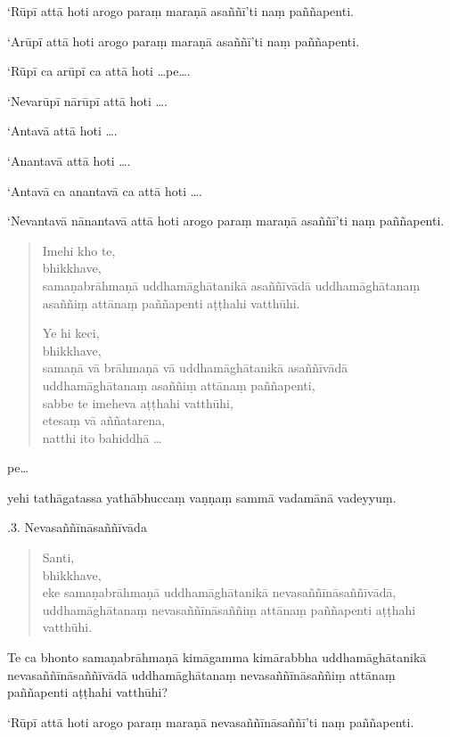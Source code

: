 \documentclass[11pt,twoside,openright]{book}
\begin{document}
\pstart
‘Rūpī attā hoti arogo paraṃ maraṇā asaññī’ti naṃ paññapenti.
\pend

\pstart
‘Arūpī attā hoti arogo paraṃ maraṇā asaññī’ti naṃ paññapenti.
\pend

\pstart
‘Rūpī ca arūpī ca attā hoti …pe….
\pend

\pstart
‘Nevarūpī nārūpī attā hoti ….
\pend

\pstart
‘Antavā attā hoti ….
\pend

\pstart
‘Anantavā attā hoti ….
\pend

\pstart
‘Antavā ca anantavā ca attā hoti ….
\pend

\pstart
‘Nevantavā nānantavā attā hoti arogo paraṃ maraṇā asaññī’ti naṃ paññapenti.
\pend

\begin{verse}
Imehi kho te,\\
\vin  bhikkhave,\\
\vin  samaṇabrāhmaṇā uddhamāghātanikā asaññīvādā uddhamāghātanaṃ asaññiṃ attānaṃ paññapenti aṭṭhahi vatthūhi.

Ye hi keci,\\
\vin  bhikkhave,\\
\vin  samaṇā vā brāhmaṇā vā uddhamāghātanikā asaññīvādā uddhamāghātanaṃ asaññiṃ attānaṃ paññapenti,\\
\vin  sabbe te imeheva aṭṭhahi vatthūhi,\\
\vin  etesaṃ vā aññatarena,\\
\vin  natthi ito bahiddhā …

\end{verse}
\pstart
pe…
\pend

\pstart
yehi tathāgatassa yathābhuccaṃ vaṇṇaṃ sammā vadamānā vadeyyuṃ.
\pend

.3. Nevasaññīnāsaññīvāda
\pend

\begin{verse}
Santi,\\
\vin  bhikkhave,\\
\vin  eke samaṇabrāhmaṇā uddhamāghātanikā nevasaññīnāsaññīvādā,\\
\vin  uddhamāghātanaṃ nevasaññīnāsaññiṃ attānaṃ paññapenti aṭṭhahi vatthūhi.

\end{verse}
\pstart
Te ca bhonto samaṇabrāhmaṇā kimāgamma kimārabbha uddhamāghātanikā nevasaññīnāsaññīvādā uddhamāghātanaṃ nevasaññīnāsaññiṃ attānaṃ paññapenti aṭṭhahi vatthūhi?
\pend

\pstart
‘Rūpī attā hoti arogo paraṃ maraṇā nevasaññīnāsaññī’ti naṃ paññapenti.
\pend
\end{document}
